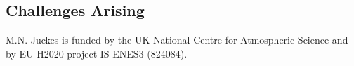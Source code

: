 \documentclass[gmd,dvipsnames]{copernicus}
\begin{document}
\subsection{Challenges Arising}


\begin{acknowledgements}
M.N. Juckes is funded by the UK National Centre for Atmospheric Science and by EU H2020 project IS-ENES3 (824084).
\end{acknowledgements}




\clearpage
\end{document}
